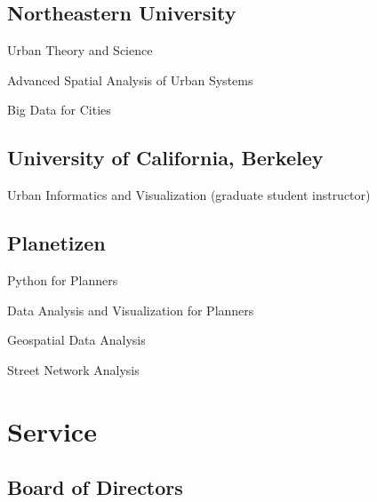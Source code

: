 \documentclass[11pt,letterpaper]{report} %
\newcommand{\listitemspace}{0.25em}
\renewenvironment{itemize}
{\begin{list}{}{\setlength{\leftmargin}{0em}
                \setlength{\parskip}{0em}
                \setlength{\itemsep}{\listitemspace}
                \setlength{\parsep}{\listitemspace}}}
{\end{list}}
\begin{document}
    \subsection*{Northeastern University}

    \begin{itemize}

        \item Urban Theory and Science
        \item Advanced Spatial Analysis of Urban Systems
        \item Big Data for Cities

    \end{itemize}

    \subsection*{University of California, Berkeley}

    \begin{itemize}

        \item Urban Informatics and Visualization (graduate student instructor)

    \end{itemize}

    \subsection*{Planetizen}

    \begin{itemize}

        \item Python for Planners
        \item Data Analysis and Visualization for Planners
        \item Geospatial Data Analysis
        \item Street Network Analysis

    \end{itemize}



    \section*{Service}

    \subsection*{Board of Directors}
\end{document}
